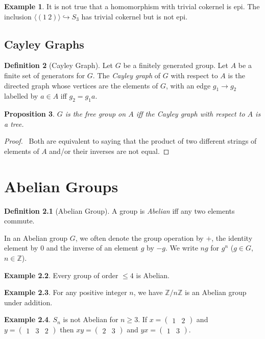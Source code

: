 \documentclass{book}
\let\qed\relax
\newtheorem{prop}{Proposition}[chapter]
\theoremstyle{definition}
\newtheorem{df}[prop]{Definition}
\newtheorem{ex}[prop]{Example}
\begin{document}
\begin{ex}
It is not true that a homomorphism with trivial cokernel is epi. The inclusion $\langle (1\ 2) \rangle \hookrightarrow S_3$ has trivial cokernel but is not epi.
\end{ex}

\section{Cayley Graphs}

\begin{df}[Cayley Graph]
Let $G$ be a finitely generated group. Let $A$ be a finite set of generators for $G$. The \emph{Cayley graph} of $G$ with respect to $A$ is the directed graph whose vertices are the elements of $G$, with an edge $g_1 \rightarrow g_2$ labelled by $a \in A$ iff $g_2 = g_1 a$.
\end{df}

\begin{prop}
$G$ is the free group on $A$ iff the Cayley graph with respect to $A$ is a tree.
\end{prop}

\begin{proof}
\pf\ Both are equivalent to saying that the product of two different strings of elements of $A$ and/or their inverses are not equal. \qed
\end{proof}

\chapter{Abelian Groups}

\begin{df}[Abelian Group]
    A group is \emph{Abelian} iff any two elements commute.
\end{df}

In an Abelian group $G$, we often denote the group operation by $+$, the
identity element by $0$ and the inverse of an element $g$ by $-g$. We write
$ng$ for $g^n$ ($g \in G$, $n \in \mathbb{Z}$).

\begin{ex}
    Every group of order $\leq 4$ is Abelian.
\end{ex}

\begin{ex}
    For any positive integer $n$, we have $\mathbb{Z} / n \mathbb{Z}$ is an Abelian group under addition.
\end{ex}

\begin{ex}
    $S_n$ is not Abelian for $n \geq 3$. If $x = \left( \begin{array}{cc} 1 & 2 \end{array} \right)$ and $y = \left( \begin{array}{ccc} 1 & 3 & 2 \end{array} \right)$ then $xy = \left( \begin{array}{cc} 2 & 3 \end{array} \right)$ and $yx = \left( \begin{array}{cc} 1 & 3 \end{array} \right)$.
\end{ex}
\end{document}

